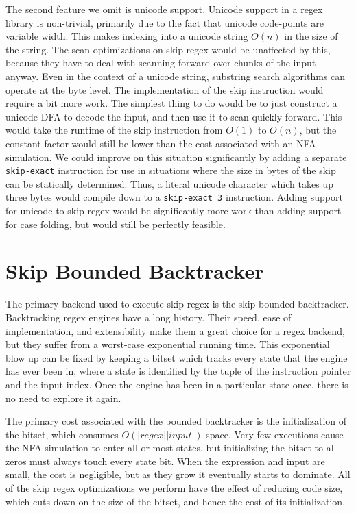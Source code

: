 The second feature we omit is unicode support. Unicode support in
a regex library is non-trivial, primarily due to the fact that
unicode code-points are variable width. This makes indexing into
a unicode string $O(n)$ in the size of the string. The scan optimizations
on skip regex would be unaffected by this, because they have to deal
with scanning forward over chunks of the input anyway. Even in the
context of a unicode string, substring search algorithms can operate at
the byte level. The implementation of the skip instruction would require
a bit more work. The simplest thing to do would be to just construct
a unicode DFA to decode the input, and then use it to scan quickly
forward. This would take the runtime of the skip instruction from
$O(1)$ to $O(n)$, but the constant factor would still be lower
than the cost associated with an NFA simulation. We could improve on
this situation significantly by adding a separate \verb'skip-exact'
instruction for use in situations where the size in bytes of the
skip can be statically determined. Thus, a literal unicode character
which takes up three bytes would compile down to a \verb'skip-exact 3'
instruction. Adding support for unicode to skip regex would be significantly
more work than adding support for case folding, but would still be
perfectly feasible.

\section{Skip Bounded Backtracker}

The primary backend used to execute skip regex is the skip bounded
backtracker. Backtracking regex engines have a long history.
Their speed, ease of implementation, and extensibility make them
a great choice for a regex backend, but they suffer from a worst-case
exponential running time. This exponential blow up can be fixed by
keeping a bitset which tracks every state that the engine has
ever been in, where a state is identified by the tuple of the
instruction pointer and the input index. Once the engine has
been in a particular state once, there is no need to explore it
again.

The primary cost associated with the bounded backtracker is
the initialization of the bitset, which consumes $O(|regex||input|)$
space. Very few executions cause the NFA simulation to enter all
or most states, but initializing the bitset to all zeros must always
touch every state bit. When the expression and input are small, the
cost is negligible, but as they grow it eventually starts to dominate.
All of the skip regex optimizations we perform have the effect of
reducing code size, which cuts down on the size of the bitset,
and hence the cost of its initialization.

